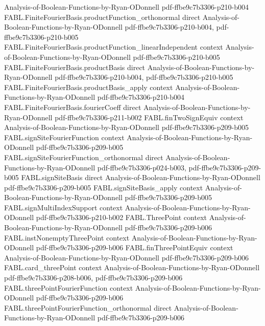 \begin{theorem}
  {Analysis-of-Boolean-Functions-by-Ryan-ODonnell}
  {pdf-ffbe9c7b3306-p210-b004}
\proofstep
  {FABL.FiniteFourierBasis.productFunction_orthonormal}
  {direct}
  {Analysis-of-Boolean-Functions-by-Ryan-ODonnell}
  {pdf-ffbe9c7b3306-p210-b004,
    pdf-ffbe9c7b3306-p210-b005}
\proofstep
  {FABL.FiniteFourierBasis.productFunction_linearIndependent}
  {context}
  {Analysis-of-Boolean-Functions-by-Ryan-ODonnell}
  {pdf-ffbe9c7b3306-p210-b005}
\proofstep
  {FABL.FiniteFourierBasis.productBasis}
  {direct}
  {Analysis-of-Boolean-Functions-by-Ryan-ODonnell}
  {pdf-ffbe9c7b3306-p210-b004,
    pdf-ffbe9c7b3306-p210-b005}
\proofstep
  {FABL.FiniteFourierBasis.productBasis_apply}
  {context}
  {Analysis-of-Boolean-Functions-by-Ryan-ODonnell}
  {pdf-ffbe9c7b3306-p210-b004}
\proofstep
  {FABL.FiniteFourierBasis.fourierCoeff}
  {direct}
  {Analysis-of-Boolean-Functions-by-Ryan-ODonnell}
  {pdf-ffbe9c7b3306-p211-b002}
\proofstep
  {FABL.finTwoSignEquiv}
  {context}
  {Analysis-of-Boolean-Functions-by-Ryan-ODonnell}
  {pdf-ffbe9c7b3306-p209-b005}
\proofstep
  {FABL.signSiteFourierFunction}
  {context}
  {Analysis-of-Boolean-Functions-by-Ryan-ODonnell}
  {pdf-ffbe9c7b3306-p209-b005}
\proofstep
  {FABL.signSiteFourierFunction_orthonormal}
  {direct}
  {Analysis-of-Boolean-Functions-by-Ryan-ODonnell}
  {pdf-ffbe9c7b3306-p024-b003,
    pdf-ffbe9c7b3306-p209-b005}
\proofstep
  {FABL.signSiteBasis}
  {direct}
  {Analysis-of-Boolean-Functions-by-Ryan-ODonnell}
  {pdf-ffbe9c7b3306-p209-b005}
\proofstep
  {FABL.signSiteBasis_apply}
  {context}
  {Analysis-of-Boolean-Functions-by-Ryan-ODonnell}
  {pdf-ffbe9c7b3306-p209-b005}
\proofstep
  {FABL.signMultiIndexSupport}
  {context}
  {Analysis-of-Boolean-Functions-by-Ryan-ODonnell}
  {pdf-ffbe9c7b3306-p210-b002}
\proofstep
  {FABL.ThreePoint}
  {context}
  {Analysis-of-Boolean-Functions-by-Ryan-ODonnell}
  {pdf-ffbe9c7b3306-p209-b006}
\proofstep
  {FABL.instNonemptyThreePoint}
  {context}
  {Analysis-of-Boolean-Functions-by-Ryan-ODonnell}
  {pdf-ffbe9c7b3306-p209-b006}
\proofstep
  {FABL.finThreePointEquiv}
  {context}
  {Analysis-of-Boolean-Functions-by-Ryan-ODonnell}
  {pdf-ffbe9c7b3306-p209-b006}
\proofstep
  {FABL.card_threePoint}
  {context}
  {Analysis-of-Boolean-Functions-by-Ryan-ODonnell}
  {pdf-ffbe9c7b3306-p208-b006,
    pdf-ffbe9c7b3306-p209-b006}
\proofstep
  {FABL.threePointFourierFunction}
  {context}
  {Analysis-of-Boolean-Functions-by-Ryan-ODonnell}
  {pdf-ffbe9c7b3306-p209-b006}
\proofstep
  {FABL.threePointFourierFunction_orthonormal}
  {direct}
  {Analysis-of-Boolean-Functions-by-Ryan-ODonnell}
  {pdf-ffbe9c7b3306-p209-b006}

\end{theorem}
